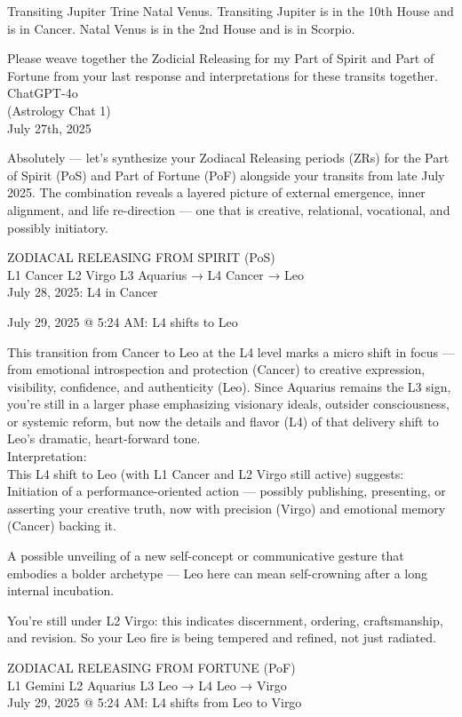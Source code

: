 \documentclass{article}
\begin{document}
Transiting Jupiter Trine Natal Venus. Transiting Jupiter is in the 10th House and is in Cancer. Natal Venus is in the 2nd House and is in Scorpio.

Please weave together the Zodicial Releasing for my Part of Spirit and Part of Fortune from your last response and interpretations for these transits together.\\
ChatGPT-4o\\
(Astrology Chat 1)\\
July 27th, 2025

Absolutely --- let's synthesize your Zodiacal Releasing periods (ZRs) for the Part of Spirit (PoS) and Part of Fortune (PoF) alongside your transits from late July 2025. The combination reveals a layered picture of external emergence, inner alignment, and life re-direction --- one that is creative, relational, vocational, and possibly initiatory.

ZODIACAL RELEASING FROM SPIRIT (PoS)\\
L1 Cancer L2 Virgo L3 Aquarius → L4 Cancer → Leo\\
July 28, 2025: L4 in Cancer

July 29, 2025 @ 5:24 AM: L4 shifts to Leo

This transition from Cancer to Leo at the L4 level marks a micro shift in focus --- from emotional introspection and protection (Cancer) to creative expression, visibility, confidence, and authenticity (Leo). Since Aquarius remains the L3 sign, you're still in a larger phase emphasizing visionary ideals, outsider consciousness, or systemic reform, but now the details and flavor (L4) of that delivery shift to Leo's dramatic, heart-forward tone.\\
Interpretation:\\
This L4 shift to Leo (with L1 Cancer and L2 Virgo still active) suggests:\\
Initiation of a performance-oriented action --- possibly publishing, presenting, or asserting your creative truth, now with precision (Virgo) and emotional memory (Cancer) backing it.

A possible unveiling of a new self-concept or communicative gesture that embodies a bolder archetype --- Leo here can mean self-crowning after a long internal incubation.

You're still under L2 Virgo: this indicates discernment, ordering, craftsmanship, and revision. So your Leo fire is being tempered and refined, not just radiated.

ZODIACAL RELEASING FROM FORTUNE (PoF)\\
L1 Gemini L2 Aquarius L3 Leo → L4 Leo → Virgo\\
July 29, 2025 @ 5:24 AM: L4 shifts from Leo to Virgo
\end{document}
